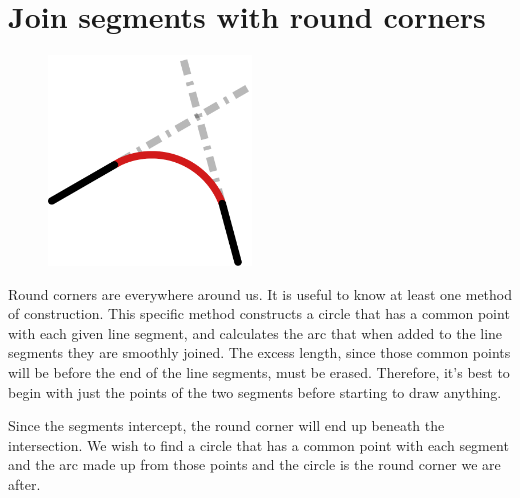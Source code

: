 \documentclass[12pt,openany,a4,usenames,dvipsnames]{book}
\begin{document}
\chapter{Join segments with round corners}\label{ch:roundcorners}
\begin{figure}
    \vspace{-60pt}
  \begin{center}
    \includegraphics[width=0.48\textwidth,keepaspectratio]{figures/fillet_main.pdf}
  \end{center}
\end{figure}
Round corners are everywhere around us. It is useful to know at least one method of construction. This specific method constructs a circle that has a common point with each given line segment, and calculates the arc that when added to the line segments they are smoothly joined. The excess length, since those common points will be before the end of the line segments, must be erased. Therefore, it's best to begin with just the points of the two segments before starting to draw anything.

Since the segments intercept, the round corner will end up beneath the intersection. We wish to find a circle
that has a common point with each segment and the arc made up from those points and the circle is the round corner we are after.
\end{document}
